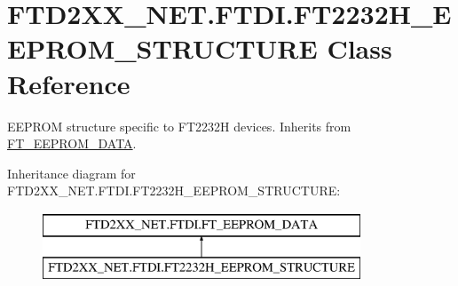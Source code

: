 \hypertarget{class_f_t_d2_x_x___n_e_t_1_1_f_t_d_i_1_1_f_t2232_h___e_e_p_r_o_m___s_t_r_u_c_t_u_r_e}{}\section{F\+T\+D2\+X\+X\+\_\+\+N\+E\+T.\+F\+T\+D\+I.\+F\+T2232\+H\+\_\+\+E\+E\+P\+R\+O\+M\+\_\+\+S\+T\+R\+U\+C\+T\+U\+RE Class Reference}
\label{class_f_t_d2_x_x___n_e_t_1_1_f_t_d_i_1_1_f_t2232_h___e_e_p_r_o_m___s_t_r_u_c_t_u_r_e}


E\+E\+P\+R\+OM structure specific to F\+T2232H devices. Inherits from \mbox{\hyperlink{class_f_t_d2_x_x___n_e_t_1_1_f_t_d_i_1_1_f_t___e_e_p_r_o_m___d_a_t_a}{F\+T\+\_\+\+E\+E\+P\+R\+O\+M\+\_\+\+D\+A\+TA}}.  


Inheritance diagram for F\+T\+D2\+X\+X\+\_\+\+N\+E\+T.\+F\+T\+D\+I.\+F\+T2232\+H\+\_\+\+E\+E\+P\+R\+O\+M\+\_\+\+S\+T\+R\+U\+C\+T\+U\+RE\+:\begin{figure}[H]
\begin{center}
\leavevmode
\includegraphics[height=2.000000cm]{class_f_t_d2_x_x___n_e_t_1_1_f_t_d_i_1_1_f_t2232_h___e_e_p_r_o_m___s_t_r_u_c_t_u_r_e}
\end{center}
\end{figure}
